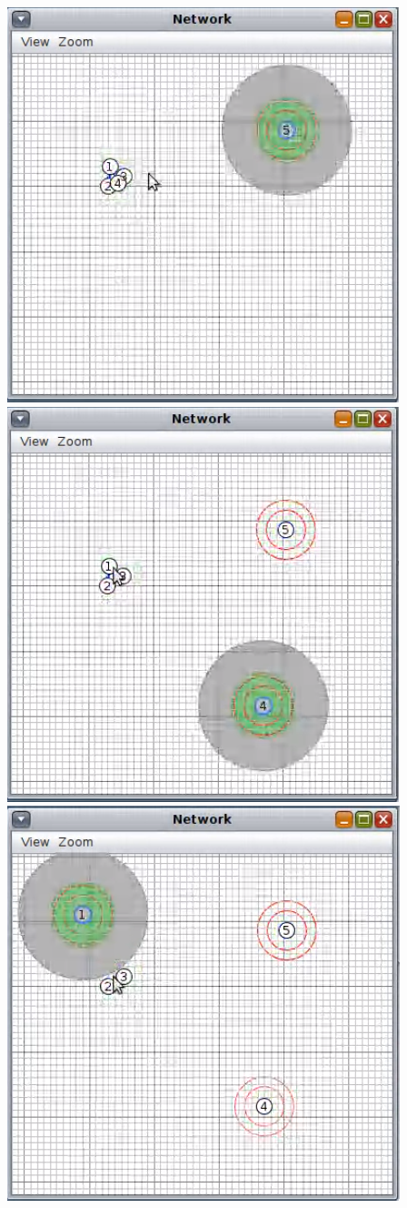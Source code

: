 \documentclass{article}
\begin{document}
\begin{center}
\includegraphics[scale=1]{img6.png}
\includegraphics[scale=1]{img7.png}
\includegraphics[scale=1]{img8.png}

\end{center}
\end{document}
